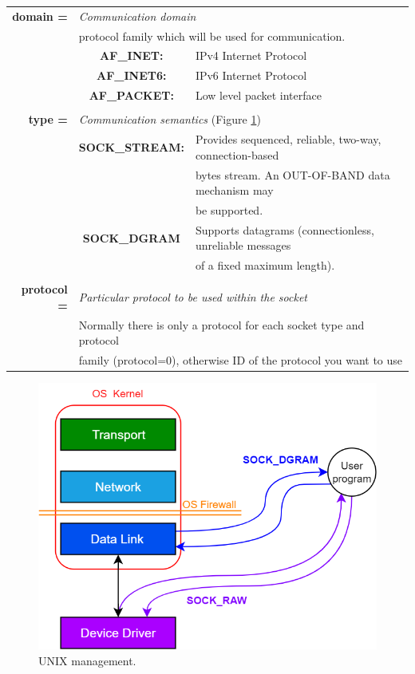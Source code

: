 \begin{table}[h]
\centering
\begin{tabular}{rcl}
\textbf{domain =} & \multicolumn{2}{l}{\textit{Communication domain}}\\
{} & \multicolumn{2}{l}{protocol family which will be used for communication.}\\
{} & \textbf{AF\_INET:} & {IPv4 Internet Protocol}\\
{} & \textbf{AF\_INET6:} & {IPv6 Internet Protocol}\\
{} & \textbf{AF\_PACKET:} & {Low level packet interface}\\
& &\\
\textbf{type =} & \multicolumn{2}{l}{\textit{Communication semantics} (Figure \ref{unix_low})}\\
{} & \textbf{SOCK\_STREAM:} & {Provides sequenced, reliable, two-way, connection-based}\\
{} & {} & {bytes stream. An OUT-OF-BAND data mechanism may}\\
{} & {} & {be supported.}\\
{} & \textbf{SOCK\_DGRAM} & {Supports datagrams (connectionless, unreliable messages} \\
& & {of a fixed maximum length).}\\
& & \\
\textbf{protocol =} & \multicolumn{2}{l}{\textit{Particular protocol to be used within the socket}}\\
{} & \multicolumn{2}{l}{Normally there is only a protocol for each socket type and protocol}\\
{} & \multicolumn{2}{l}{family (protocol=0), otherwise ID of the protocol you want to use}\\
\end{tabular}
\end{table}
\begin{figure}[H]
\centering
\includegraphics[scale=0.4]{Images/NetworkC/unix_low}
\caption{\footnotesize{UNIX management.}}\label{unix_low}
\end{figure}

